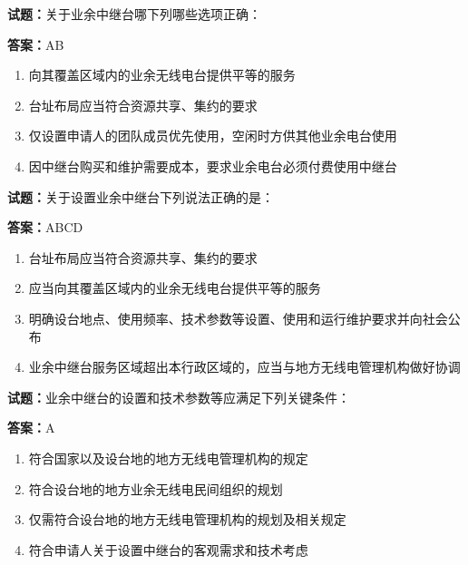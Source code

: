 \documentclass{ctexbook}
\begin{document}
\textbf{试题：}关于业余中继台哪下列哪些选项正确： 

\textbf{答案：}AB 

\begin{enumerate}[leftmargin=3em]
  \item 向其覆盖区域内的业余无线电台提供平等的服务 

  \item 台址布局应当符合资源共享、集约的要求 

  \item 仅设置申请人的团队成员优先使用，空闲时方供其他业余电台使用 

  \item 因中继台购买和维护需要成本，要求业余电台必须付费使用中继台 

\end{enumerate}





\vspace{1em}

\textbf{试题：}关于设置业余中继台下列说法正确的是： 

\textbf{答案：}ABCD 

\begin{enumerate}[leftmargin=3em]
  \item 台址布局应当符合资源共享、集约的要求 

  \item 应当向其覆盖区域内的业余无线电台提供平等的服务 

  \item 明确设台地点、使用频率、技术参数等设置、使用和运行维护要求并向社会公布 

  \item 业余中继台服务区域超出本行政区域的，应当与地方无线电管理机构做好协调 

\end{enumerate}





\vspace{1em}

\textbf{试题：}业余中继台的设置和技术参数等应满足下列关键条件： 

\textbf{答案：}A 

\begin{enumerate}[leftmargin=3em]
  \item 符合国家以及设台地的地方无线电管理机构的规定 

  \item 符合设台地的地方业余无线电民间组织的规划 

  \item 仅需符合设台地的地方无线电管理机构的规划及相关规定 

  \item 符合申请人关于设置中继台的客观需求和技术考虑 

\end{enumerate}
\end{document}
